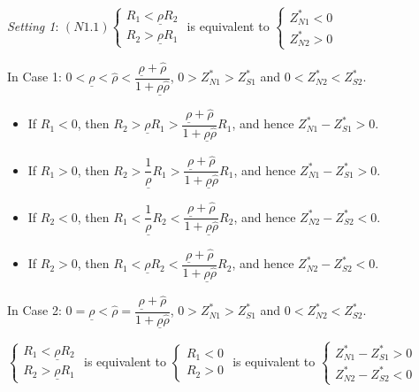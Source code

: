 \documentclass[10pt]{article}
\begin{document}
{\it Setting 1}: $ (N1.1) \left\{ \begin{matrix} R_1 < \underline{\rho} R_2 \\ R_2 > \underline{\rho} R_1 \end{matrix} \right. $ is equivalent to $ \left\{ \begin{matrix} Z_{N 1}^* < 0 \\ Z_{N 2}^* > 0 \end{matrix} \right. $

In Case 1: $ 0 < \underline{\rho} < {\hat \rho} < \dfrac{\underline{\rho} + {\hat \rho}}{1 + \underline{\rho} {\hat \rho}} $, $ 0 > Z_{N 1}^* > Z_{S 1}^* $ and $ 0 < Z_{N 2}^* < Z_{S 2}^* $.
\begin{itemize}
\item If $ R_1 < 0 $, then $ R_2 > \underline{\rho} R_1 > \dfrac{\underline{\rho} + {\hat \rho}}{1 + \underline{\rho} {\hat \rho}} R_1 $, and hence $ Z_{N 1}^* - Z_{S 1}^* > 0 $.
\item If $ R_1 > 0 $, then $ R_2 > \dfrac{1}{\underline{\rho}} R_1 > \dfrac{\underline{\rho} + {\hat \rho}}{1 + \underline{\rho} {\hat \rho}} R_1 $, and hence $ Z_{N 1}^* - Z_{S 1}^* > 0 $.
\item If $ R_2 < 0 $, then $ R_1 < \dfrac{1}{\underline{\rho}} R_2 < \dfrac{\underline{\rho} + {\hat \rho}}{1 + \underline{\rho} {\hat \rho}} R_2 $, and hence $ Z_{N 2}^* - Z_{S 2}^* < 0 $.
\item If $ R_2 > 0 $, then $ R_1 < \underline{\rho} R_2 < \dfrac{\underline{\rho} + {\hat \rho}}{1 + \underline{\rho} {\hat \rho}} R_2 $, and hence $ Z_{N 2}^* - Z_{S 2}^* < 0 $.
\end{itemize}

In Case 2: $ 0 = \underline{\rho} < {\hat \rho} = \dfrac{\underline{\rho} + {\hat \rho}}{1 + \underline{\rho} {\hat \rho}} $, $ 0 > Z_{N 1}^* > Z_{S 1}^* $ and $ 0 < Z_{N 2}^* < Z_{S 2}^* $.

$ \left\{ \begin{matrix} R_1 < \underline{\rho} R_2 \\ R_2 > \underline{\rho} R_1 \end{matrix} \right. $ is equivalent to $ \left\{ \begin{matrix} R_1 < 0 \\ R_2 > 0 \end{matrix} \right. $ is equivalent to $ \left\{ \begin{matrix} Z_{N 1}^* - Z_{S 1}^* > 0 \\ Z_{N 2}^* - Z_{S 2}^* < 0 \end{matrix} \right. $
\end{document}
